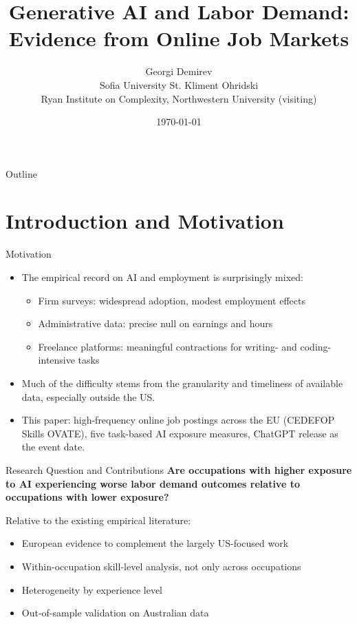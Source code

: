 \documentclass{beamer}
\title[Generative AI and Labor Demand]{Generative AI and Labor Demand:\\
Evidence from Online Job Markets}
\author[Georgi Demirev]{Georgi Demirev\\
\footnotesize Sofia University St. Kliment Ohridski\\
Ryan Institute on Complexity, Northwestern University (visiting)}
\date{\today}
\begin{document}
\begin{frame}
  \titlepage
\end{frame}

\begin{frame}{Outline}
  \tableofcontents
\end{frame}

\section{Introduction and Motivation}
\begin{frame}{Motivation}
\begin{itemize}
    \item The empirical record on AI and employment is surprisingly mixed:
    \begin{itemize}
        \item Firm surveys: widespread adoption, modest employment effects \citep{yotzov2026firmdata}
        \item Administrative data: precise null on earnings and hours \citep{humlum2025stillwaters}
        \item Freelance platforms: meaningful contractions for writing- and coding-intensive tasks \citep{demirci2025replacing, hui2023shortterm}
    \end{itemize}
    \item Much of the difficulty stems from the granularity and timeliness of available data, especially outside the US.
    \item This paper: high-frequency online job postings across the EU (CEDEFOP Skills OVATE), five task-based AI exposure measures, ChatGPT release as the event date.
\end{itemize}
\end{frame}

\begin{frame}{Research Question and Contributions}
    \textbf{Are occupations with higher exposure to AI experiencing worse labor demand outcomes relative to occupations with lower exposure?}

    \vspace{0.4cm}
    Relative to the existing empirical literature:
    \begin{itemize}
        \item European evidence to complement the largely US-focused work
        \item Within-occupation skill-level analysis, not only across occupations
        \item Heterogeneity by experience level
        \item Out-of-sample validation on Australian data
    \end{itemize}
\end{frame}
\end{document}
